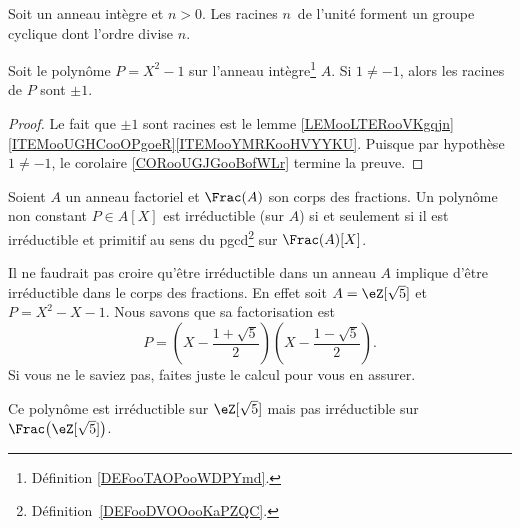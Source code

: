 \begin{proposition}
	Soit un anneau intègre et \( n>0\). Les racines \( n\)\ieme\ de l'unité forment un groupe cyclique dont l'ordre divise \( n\).
\end{proposition}

\begin{lemma}       \label{LEMooHDJIooPTpUCJ}
	Soit le polynôme \( P=X^2-1\) sur l'anneau intègre\footnote{Définition \ref{DEFooTAOPooWDPYmd}.} \( A\). Si \( 1\neq -1\), alors les racines de \( P\) sont \( \pm 1\).
\end{lemma}

\begin{proof}
	Le fait que \( \pm 1\) sont racines est le lemme \ref{LEMooLTERooVKgqjn}\ref{ITEMooUGHCooOPgoeR}\ref{ITEMooYMRKooHVYYKU}. Puisque par hypothèse \( 1\neq -1\), le corolaire \ref{CORooUGJGooBofWLr} termine la preuve.
\end{proof}

\begin{corollary}       \label{CORooZCSOooHQVAOV}
	Soient \( A\) un anneau factoriel et \( \Frac(A)\) son corps des fractions. Un polynôme non constant \( P\in A[X]\) est irréductible (sur \( A\)) si et seulement si il est irréductible et primitif au sens du pgcd\footnote{Définition~\ref{DEFooDVOOooKaPZQC}.} sur \( \Frac(A)[X]\).
\end{corollary}

\begin{example}
	Il ne faudrait pas croire qu'être irréductible dans un anneau \( A\) implique d'être irréductible dans le corps des fractions. En effet soit \( A=\eZ[\sqrt{ 5 }]\) et \( P=X^2-X-1\). Nous savons que sa factorisation est
	\begin{equation}
		P=\left( X-\frac{ 1+\sqrt{ 5 } }{ 2 } \right)\left( X-\frac{ 1-\sqrt{ 5 } }{ 2 } \right).
	\end{equation}
	Si vous ne le saviez pas, faites juste le calcul pour vous en assurer.

	Ce polynôme est irréductible sur \( \eZ[\sqrt{ 5 }]\) mais pas irréductible sur \( \Frac\big( \eZ[\sqrt{ 5 }] \big)\).
\end{example}

